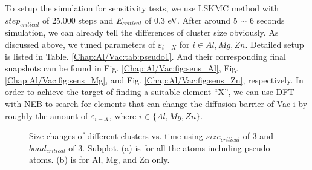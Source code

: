 To setup the simulation for sensitivity tests, we use \ac{LSKMC} method with $step_{critical}$ of 25,000 steps and $E_{critical}$ of 0.3 eV. After around 5 $\sim$ 6 seconds simulation, we can already tell the differences of cluster size obviously. As discussed above, we tuned parameters of $\varepsilon_{i-X}$ for $i \in {Al, Mg, Zn}$. Detailed setup is listed in Table. \ref{Chap:Al/Vac:tab:pseudo1}. And their corresponding final snapshots can be found in Fig. \ref{Chap:Al/Vac:fig:sens_Al}, Fig. \ref{Chap:Al/Vac:fig:sens_Mg}, and Fig. \ref{Chap:Al/Vac:fig:sens_Zn}, respectively. In order to achieve the target of finding a suitable element ``X'', we can use \ac{DFT} with \ac{NEB} to search for elements that can change the diffusion barrier of Vac-i by roughly the amount of $\varepsilon_{i-X}$, where $i \in \{Al, Mg, Zn\}$.


\newpage
\begingroup
\begin{figure}[!ht]
  \centering
\caption[Size changes of different clusters vs. time using $size_{critical}$ of 3 and $bond_{critical}$ of 3.]{Size changes of different clusters vs. time using $size_{critical}$ of 3 and $bond_{critical}$ of 3. Subplot. (a) is for all the atoms including pseudo atoms. (b) is for Al, Mg, and Zn only.}
\label{Chap:Al/Vac:fig:sens_cluster_size}
\end{figure}
\endgroup


